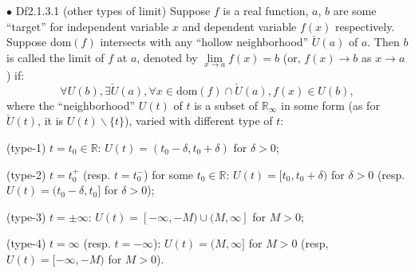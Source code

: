 \documentclass{article}
\begin{document}
\begin{Df}{$\bullet$ Df2.1.3.1 (other types of limit)}
    Suppose $f$ is a real function, $a$, $b$ are some ``target'' for independent variable $x$ and dependent variable $f(x)$ respectively. Suppose $\text{dom}(f)$ intersects with any ``hollow neighborhood'' $\check{U}(a)$ of $a$. Then $b$ is called the limit of $f$ at $a$, denoted by $\lim\limits_{x\to a} f(x) = b$ (or, $f(x)\rightarrow b$ as $x\rightarrow a$) if:
    $$\forall U(b), \exists\check{U}(a), \forall x\in\text{dom}(f)\cap \check{U}(a), f(x)\in U(b),$$
    where the ``neighborhood'' $U(t)$ of $t$ is a subset of $\mathbb{R}_\infty$ in some form (as for $\check{U}(t)$, it is $U(t)\backslash \{t\}$), varied with different type of $t$:
    \begin{compactitem}
        \item (type-1) $t = t_0\in\mathbb{R}$: $U(t) = (t_0-\delta, t_0+\delta)$ for $\delta>0$;
        \item (type-2) $t = t_0^+$ (resp. $t = t_0^-$) for some $t_0\in\mathbb{R}$: $U(t) = [t_0, t_0+\delta)$ for $\delta>0$ (resp. $U(t) = (t_0-\delta, t_0]$ for $\delta>0$);
        \item (type-3) $t = \pm\infty$: $U(t) = [-\infty, -M)\cup (M, \infty]$ for $M>0$;
        \item (type-4) $t = \infty$ (resp. $t = -\infty$): $U(t) = (M, \infty]$ for $M>0$ (resp, $U(t) = [-\infty, -M)$ for $M>0$).
    \end{compactitem}
\end{Df}
\end{document}
